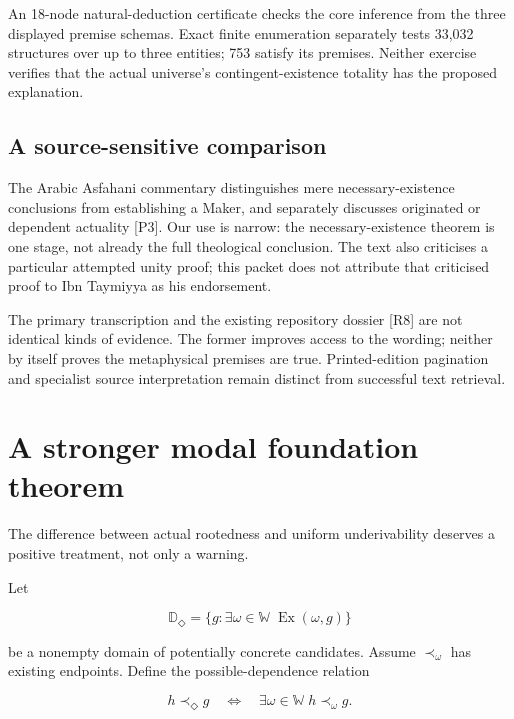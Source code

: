 \documentclass[11pt,a4paper]{article}
\begin{document}
An 18-node natural-deduction certificate checks the core inference from
the three displayed premise schemas. Exact finite enumeration separately
tests 33,032 structures over up to three entities; 753 satisfy its
premises. Neither exercise verifies that the actual universe's
contingent-existence totality has the proposed explanation.

\subsection{A source-sensitive
comparison}\label{a-source-sensitive-comparison}

The Arabic Asfahani commentary distinguishes mere necessary-existence
conclusions from establishing a Maker, and separately discusses
originated or dependent actuality {[}P3{]}. Our use is narrow: the
necessary-existence theorem is one stage, not already the full
theological conclusion. The text also criticises a particular attempted
unity proof; this packet does not attribute that criticised proof to Ibn
Taymiyya as his endorsement.

The primary transcription and the existing repository dossier {[}R8{]}
are not identical kinds of evidence. The former improves access to the
wording; neither by itself proves the metaphysical premises are true.
Printed-edition pagination and specialist source interpretation remain
distinct from successful text retrieval.

\section{A stronger modal foundation
theorem}\label{a-stronger-modal-foundation-theorem}

The difference between actual rootedness and uniform underivability
deserves a positive treatment, not only a warning.

Let

\nopagebreak[4]

\[
\mathbb D_\Diamond
 =\{g:\exists\omega\in\mathbb W\;\operatorname{Ex}(\omega,g)\}
\]

be a nonempty domain of potentially concrete candidates. Assume
\(\prec_\omega\) has existing endpoints. Define the possible-dependence
relation

\nopagebreak[4]

\[
h\prec_\Diamond g
\quad\Longleftrightarrow\quad
\exists\omega\in\mathbb W\;h\prec_\omega g.
\]

\end{document}
